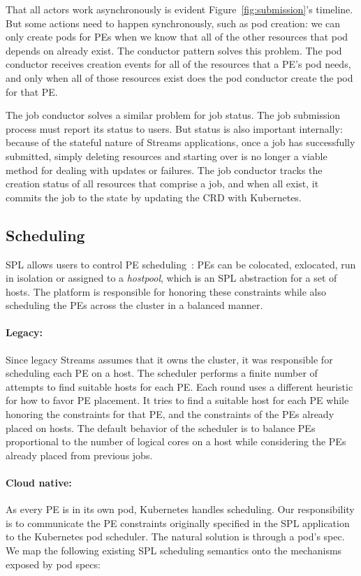 That all actors work asynchronously is evident Figure~\ref{fig:submission}'s
timeline.  But some actions need to happen synchronously, such as pod creation:
we can only create pods for PEs when we know that all of the other resources
that pod depends on already exist.  The conductor pattern solves this problem.
The pod conductor receives creation events for all of the resources that a PE's
pod needs, and only when all of those resources exist does the pod conductor
create the pod for that PE.

The job conductor solves a similar problem for job status.  The job submission
process must report its status to users.  But status is also important
internally: because of the stateful nature of Streams applications, once a job
has successfully submitted, simply deleting resources and starting over is no
longer a viable method for dealing with updates or failures. The job conductor
tracks the creation status of all resources that comprise a job, and when all
exist, it commits the job to the  state by updating the CRD with
Kubernetes.

\subsection{Scheduling}

SPL allows users to control PE scheduling~\cite{spl_placement}: PEs can
be colocated, exlocated, run in isolation or assigned to a \emph{hostpool},
which is an SPL abstraction for a set of hosts. The platform is responsible for
honoring these constraints while also scheduling the PEs across the cluster in a
balanced manner.

\paragraph{Legacy:} Since legacy Streams assumes that it owns the cluster, it
was responsible for scheduling each PE on a host. The scheduler performs a
finite number of attempts to find suitable hosts for each PE. Each round uses a
different heuristic for how to favor PE placement. It tries to find a suitable
host for each PE while honoring the constraints for that PE, and the constraints
of the PEs already placed on hosts. The default behavior of the scheduler is to
balance PEs proportional to the number of logical cores on a host while
considering the PEs already placed from previous jobs.

\paragraph{Cloud native:} As every PE is in its own pod, Kubernetes handles
scheduling. Our responsibility is to communicate the PE constraints originally
specified in the SPL application to the Kubernetes pod scheduler. The
natural solution is through a pod's spec. We map the following existing SPL
scheduling semantics onto the mechanisms exposed by pod specs:

